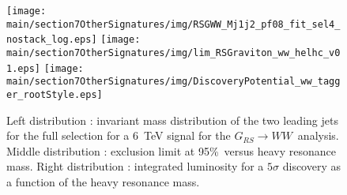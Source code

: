 \begin{figure}[htbp]
  \centering
  \texttt{[image: \\main/section7OtherSignatures/img/RSGWW\_Mj1j2\_pf08\_fit\_sel4\_nostack\_log.eps]}
  \texttt{[image: \\main/section7OtherSignatures/img/lim\_RSGraviton\_ww\_helhc\_v01.eps]}
  \texttt{[image: \\main/section7OtherSignatures/img/DiscoveryPotential\_ww\_tagger\_rootStyle.eps]}

  \caption{Left distribution : invariant mass distribution of the two leading jets for the full selection for a 6~TeV signal for the $G_{RS} \rightarrow WW$\ analysis. Middle distribution : exclusion limit at 95\%~\cl versus heavy resonance mass. Right distribution : integrated luminosity for a $5\sigma$ discovery as a function of the heavy resonance mass.}
  \label{fig:hadronicresonances:wwsel04}
\end{figure}

\begin{table}[!htb]\centering
{}
\caption{Final yield of $RSG \rightarrow WW$ analysis.}
\label{tab:RSGwwYield}
\end{table}


